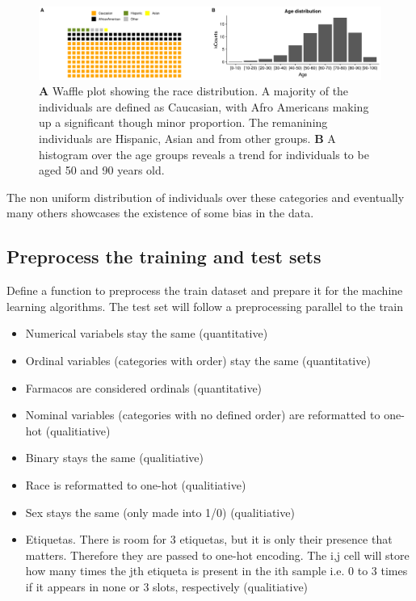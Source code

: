 \documentclass{article}\usepackage[]{graphicx}\usepackage[]{color}
\begin{document}
  
\begin{figure}[!h]
\includegraphics[width=\textwidth]{plots/visualize_categories.png}
\caption{\textbf{A} Waffle plot showing the race distribution. A majority of the individuals are defined as Caucasian, with Afro Americans making up a significant though minor proportion. The remanining individuals are Hispanic, Asian and from other groups. \textbf{B} A histogram over the age groups reveals a trend for individuals to be aged 50 and 90 years old.}
\label{fig:categories}
\end{figure}
  
The non uniform distribution of individuals over these categories and eventually many others showcases the existence of some bias in the data.

\subsection{Preprocess the training and test sets}

Define a function to preprocess the train dataset and prepare it for the machine learning algorithms. The test set will follow a preprocessing parallel to the train

\begin{itemize}
\item Numerical variabels stay the same (quantitative)
\item Ordinal variables (categories with order) stay the same (quantitative)
\item Farmacos are considered ordinals (quantitative)
\item Nominal variables (categories with no defined order) are reformatted to one-hot (qualitiative)
\item Binary stays the same (qualitiative)
\item Race is reformatted to one-hot (qualitiative)
\item Sex stays the same (only made into 1/0) (qualitiative)
\item Etiquetas. There is room for 3 etiquetas, but it is only their presence that matters. Therefore they are passed to one-hot encoding. The i,j cell will store how many times the jth etiqueta is present in the ith sample i.e. 0 to 3 times if it appears in none or 3 slots, respectively (qualitiative)
\end{itemize}
\end{document}
